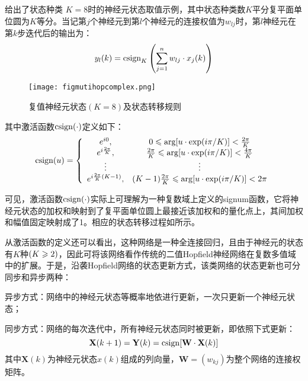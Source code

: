  给出了状态种类 $K=8$时的神经元状态取值示例，其中状态种类数$K$平分复平面单位圆为$K$等分。当记第$j$个神经元到第$l$个神经元的连接权值为$w_{lj}$时，第$l$神经元在第$k$步迭代后的输出为：
\begin{equation}
y_l(k) = \operatorname{csign}_K\left(\sum\limits_{j=1}^n w_{lj}\cdot x_j(k)\right)
\label{eqiter}
\end{equation}
\begin{figure}[!htbp]
	\centering
	\texttt{[image: figmutihopcomplex.png]}
	\caption{复值神经元状态$(K=8)$及状态转移规则}
     \label{figmulti}
\end{figure}

其中激活函数$\operatorname{csign}(\cdot)$定义如下：
\begin{equation}
\operatorname{csign}(u)=
\left\{
\begin{array}{cc}
	e^{i0},&0\leqslant\arg[u\cdot\exp(i\pi/K)]<\frac{2\pi}{K}\\
	e^{i\frac{2\pi}{K}},&\frac{2\pi}{K}\leqslant\arg[u\cdot\exp(i\pi/K)]<\frac{4\pi}{K}\\
	\vdots&\vdots\\
	e^{i\frac{2\pi}{K}(K-1)},&(K-1)\frac{2\pi}{K}
	                                  \leqslant\arg[u\cdot\exp(i\pi/K)]<2\pi\\
\end{array}
\right.
\end{equation}

可见，激活函数$\operatorname{csign}(\cdot)$实际上可理解为一种复数域上定义的signum函数，它将神经元状态的加权和映射到了复平面单位圆上最接近该加权和的量化点上，其间加权和幅值固定映射成了1。相应的状态转移过程如所示。

从激活函数的定义还可以看出，这种网络是一种全连接回归，且由于神经元的状态有$K$种$(K\geqslant2)$，因此可将该网络看作传统的二值Hopf\/ield神经网络在复数多值域中的扩展。于是，沿袭Hopf\/ield网络的状态更新方式，该类网络的状态更新也可分同步和异步两种：

异步方式：网络中的神经元状态等概率地依进行更新，一次只更新一个神经元状态；

同步方式：网络的每次迭代中，所有神经元状态同时被更新，即依照下式更新：\begin{equation}
{\mathbf{ X}}(k+1)=\mathbf{ Y}(k)=\operatorname{csign}[\mathbf{ W }\cdot\mathbf{ X }(k)]               
\end{equation}
其中$\mathbf{ X}(k)$为神经元状态$x(k)$组成的列向量，$\mathbf{ W}=(w_{kj})$为整个网络的连接权矩阵。

